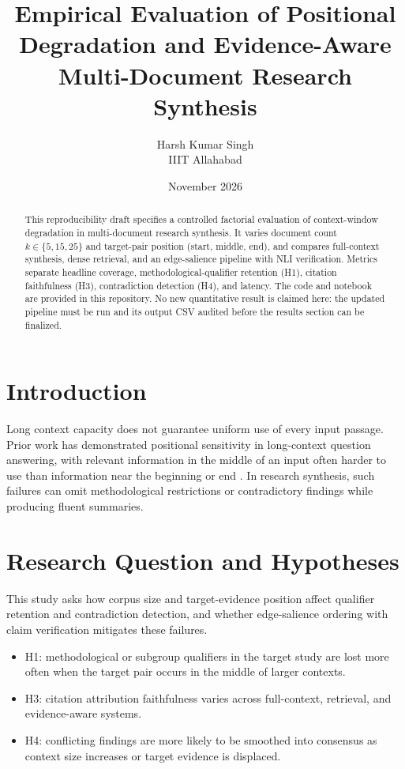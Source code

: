 \documentclass[10pt,twocolumn]{article}
\title{Empirical Evaluation of Positional Degradation and Evidence-Aware Multi-Document Research Synthesis}
\author{Harsh Kumar Singh\\IIIT Allahabad}
\date{November 2026}
\begin{document}
\maketitle
\begin{abstract}
This reproducibility draft specifies a controlled factorial evaluation of context-window degradation in multi-document research synthesis. It varies document count $k\in\{5,15,25\}$ and target-pair position (start, middle, end), and compares full-context synthesis, dense retrieval, and an edge-salience pipeline with NLI verification. Metrics separate headline coverage, methodological-qualifier retention (H1), citation faithfulness (H3), contradiction detection (H4), and latency. The code and notebook are provided in this repository. No new quantitative result is claimed here: the updated pipeline must be run and its output CSV audited before the results section can be finalized.
\end{abstract}
\section{Introduction}
Long context capacity does not guarantee uniform use of every input passage. Prior work has demonstrated positional sensitivity in long-context question answering, with relevant information in the middle of an input often harder to use than information near the beginning or end \cite{liu2024lost}. In research synthesis, such failures can omit methodological restrictions or contradictory findings while producing fluent summaries.
\section{Research Question and Hypotheses}
This study asks how corpus size and target-evidence position affect qualifier retention and contradiction detection, and whether edge-salience ordering with claim verification mitigates these failures.
\begin{itemize}
\item H1: methodological or subgroup qualifiers in the target study are lost more often when the target pair occurs in the middle of larger contexts.
\item H3: citation attribution faithfulness varies across full-context, retrieval, and evidence-aware systems.
\item H4: conflicting findings are more likely to be smoothed into consensus as context size increases or target evidence is displaced.
\end{itemize}
\end{document}

